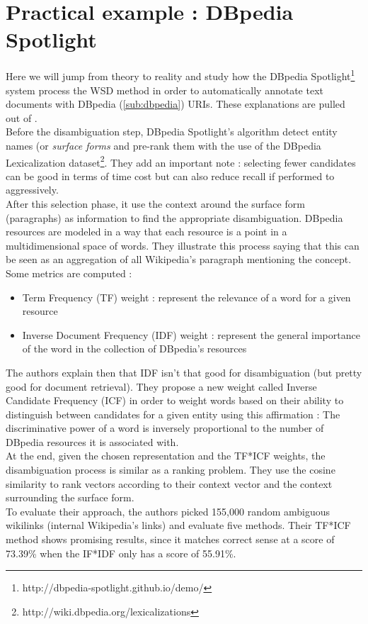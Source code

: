 
\section{Practical example : DBpedia Spotlight} %
\label{sec:dbpedia_spotlight}
Here we will jump from theory to reality and study how the DBpedia Spotlight\footnote{http://dbpedia-spotlight.github.io/demo/} system process the WSD method in order to automatically annotate text documents with DBpedia (\ref{sub:dbpedia}) URIs. These explanations are pulled out of \cite{mendes2011dbpedia}.\\
Before the disambiguation step, DBpedia Spotlight's algorithm detect entity names (or \textit{surface forms} and pre-rank them with the use of the DBpedia Lexicalization dataset\footnote{http://wiki.dbpedia.org/lexicalizations}. They add an important note : selecting fewer candidates can be good in terms of time cost but can also reduce recall if performed to aggressively.\\
After this selection phase, it use the context around the surface form (paragraphs) as information to find the appropriate disambiguation. DBpedia resources are modeled in a way that each resource is a point in a multidimensional space of words. They illustrate this process saying that this can be seen as an aggregation of all Wikipedia's paragraph mentioning the concept. Some metrics are computed :
\begin{itemize}
	\item Term Frequency (TF) weight : represent the relevance of a word for a given resource
	\item Inverse Document Frequency (IDF) weight : represent the general importance of the word in the collection of DBpedia's resources
\end{itemize}
The authors explain then that IDF isn't that good for disambiguation (but pretty good for document retrieval). They propose a new weight called Inverse Candidate Frequency (ICF) in order to weight words based on their ability to distinguish between candidates for a given entity using this affirmation : The discriminative power of a word is inversely proportional to the number of DBpedia resources it is associated with.\\
At the end, given the chosen representation and the TF*ICF weights, the disambiguation process is similar as a ranking problem. They use the cosine similarity to rank vectors according to their context vector and the context surrounding  the surface form.\\
To evaluate their approach, the authors picked 155,000 random ambiguous wikilinks (internal Wikipedia's links) and evaluate five methods. Their TF*ICF method shows promising results, since it matches correct sense at a score of 73.39\% when the IF*IDF only has a score of 55.91\%.

